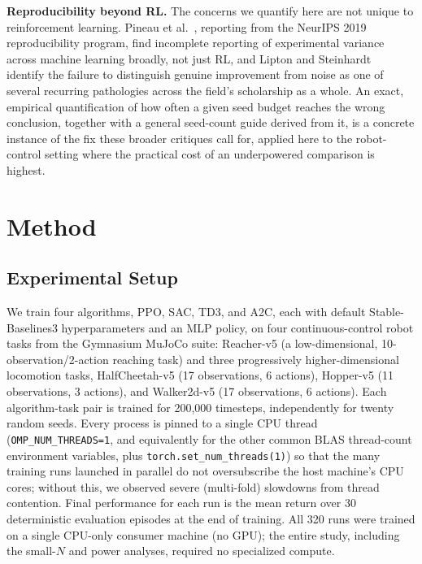 \documentclass[journal]{IEEEtran}
\begin{document}
\textbf{Reproducibility beyond RL.} The concerns we quantify here are not unique to reinforcement
learning. Pineau et al.~\cite{pineau2021improving}, reporting from the NeurIPS 2019 reproducibility
program, find incomplete reporting of experimental variance across machine learning broadly, not
just RL, and Lipton and Steinhardt~\cite{lipton2019troubling} identify the failure to distinguish
genuine improvement from noise as one of several recurring pathologies across the field's
scholarship as a whole. An exact, empirical quantification of how often a given seed budget
reaches the wrong conclusion, together with a general seed-count guide derived from it, is a
concrete instance of the fix these broader critiques call for, applied here to the robot-control
setting where the practical cost of an underpowered comparison is highest.

\section{Method}

\subsection{Experimental Setup}

We train four algorithms, PPO, SAC, TD3, and A2C, each with default Stable-Baselines3
hyperparameters and an MLP policy, on four continuous-control robot tasks from the Gymnasium MuJoCo
suite: Reacher-v5 (a low-dimensional, 10-observation/2-action reaching task) and three
progressively higher-dimensional locomotion tasks, HalfCheetah-v5 (17 observations, 6 actions),
Hopper-v5 (11 observations, 3 actions), and Walker2d-v5 (17 observations, 6 actions). Each
algorithm-task pair is trained for 200{,}000 timesteps, independently for twenty random seeds.
Every process is pinned to a single CPU thread
(\texttt{OMP\_NUM\_THREADS=1}, and equivalently for the other common BLAS thread-count
environment variables, plus \texttt{torch.set\_num\_threads(1)}) so that the many training runs
launched in parallel do not oversubscribe the host machine's CPU cores; without this, we observed
severe (multi-fold) slowdowns from thread contention. Final performance for each run is the mean
return over 30 deterministic evaluation episodes at the end of training. All 320 runs were trained
on a single CPU-only consumer machine (no GPU); the entire study, including the small-$N$ and
power analyses, required no specialized compute.
\end{document}
